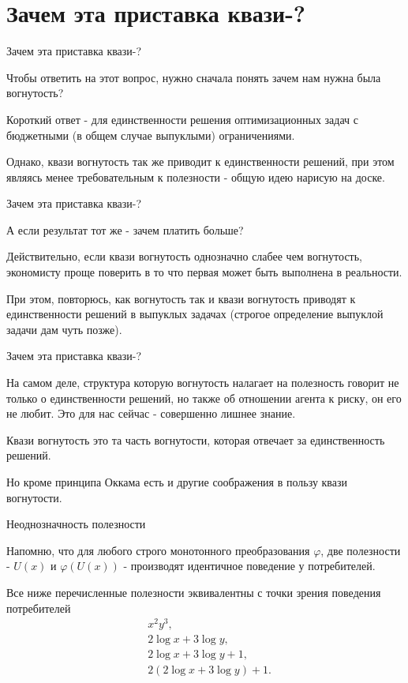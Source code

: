 \documentclass{beamer}
\begin{document}
\section{Зачем эта приставка квази-?}

\begin{frame}{Зачем эта приставка квази-?}

Чтобы ответить на этот вопрос, нужно сначала понять \alert{зачем нам нужна была вогнутость}? 

Короткий ответ - \alert{для единственности решения оптимизационных} задач с бюджетными (в общем случае выпуклыми) ограничениями.

Однако, \alert{квази вогнутость так же приводит к единственности} решений, при этом являясь менее требовательным к полезности - \alert{общую идею нарисую на доске}.

\end{frame}

\begin{frame}{Зачем эта приставка квази-?}

А если результат тот же - зачем платить больше? 

Действительно, если квази вогнутость однозначно слабее чем вогнутость, экономисту проще поверить в то что первая может быть выполнена в реальности.

При этом, повторюсь, \alert{как вогнутость так и квази вогнутость приводят к единственности решений в выпуклых задачах} (строгое определение выпуклой задачи дам чуть позже).
\end{frame}

\begin{frame}{Зачем эта приставка квази-?}

На самом деле, структура которую вогнутость налагает на полезность говорит не только о единственности решений, но также об отношении агента к риску, он его не любит. Это для нас сейчас - совершенно лишнее знание.

Квази вогнутость это та часть вогнутости, которая отвечает за единственность решений. 

Но кроме принципа Оккама \alert{есть и другие соображения в пользу квази вогнутости}.

\end{frame}


\begin{frame}{Неоднозначность полезности}

Напомню, что для любого строго монотонного преобразования $\varphi$, две полезности - $U(x)$ и $\varphi(U(x))$ - производят идентичное поведение у потребителей.  

Все ниже перечисленные полезности эквивалентны с точки зрения поведения потребителей
\begin{align*}
& x^2y^3,\\
& 2\log x + 3\log y,\\
& 2\log x + 3\log y + 1,\\
& 2(2\log x + 3\log y) + 1.
\end{align*}

\end{frame}
\end{document}
